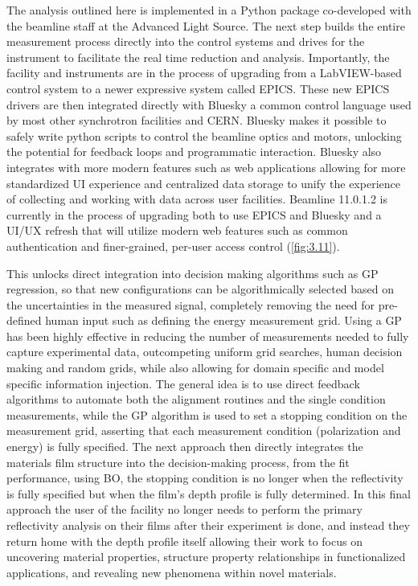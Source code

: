 The analysis outlined here is implemented in a Python package co-developed with the beamline staff at the Advanced Light Source.\autocite{ALSRSOXSPxrreduce2026} The next step builds the entire measurement process directly into the control systems and drives for the instrument to facilitate the real time reduction and analysis. Importantly, the facility and instruments are in the process of upgrading from a LabVIEW-based control system to a newer expressive system called EPICS. These new EPICS drivers are then integrated directly with Bluesky a common control language used by most other synchrotron facilities and CERN. Bluesky makes it possible to safely write python scripts to control the beamline optics and motors, unlocking the potential for feedback loops and programmatic interaction. Bluesky also integrates with more modern features such as web applications allowing for more standardized UI experience and centralized data storage to unify the experience of collecting and working with data across user facilities. Beamline 11.0.1.2 is currently in the process of upgrading both to use EPICS and Bluesky and a UI/UX refresh that will utilize modern web features such as common authentication and finer-grained, per-user access control (\cref{fig:3.11}).

This unlocks direct integration into decision making algorithms such as GP regression, so that new configurations can be algorithmically selected based on the uncertainties in the measured signal, completely removing the need for pre-defined human input such as defining the energy measurement grid. Using a GP has been highly effective in reducing the number of measurements needed to fully capture experimental data, outcompeting uniform grid searches, human decision making and random grids, while also allowing for domain specific and model specific information injection.\autocite{duDemonstrationAIdrivenWorkflow2025,alghalayiniMachinelearningbasedEfficientParameter2025} The general idea is to use direct feedback algorithms to automate both the alignment routines and the single condition measurements, while the GP algorithm is used to set a stopping condition on the measurement grid, asserting that each measurement condition (polarization and energy) is fully specified. The next approach then directly integrates the materials film structure into the decision-making process, from the fit performance, using BO, the stopping condition is no longer when the reflectivity is fully specified but when the film's depth profile is fully determined. In this final approach the user of the facility no longer needs to perform the primary reflectivity analysis on their films after their experiment is done, and instead they return home with the depth profile itself allowing their work to focus on uncovering material properties, structure property relationships in functionalized applications, and revealing new phenomena within novel materials.

